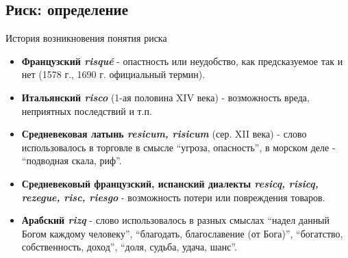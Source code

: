 \documentclass[financial_risks_lectures.tex]{subfiles}
\begin{document}
\subsection{Риск: определение}
\begin{frame}[shrink=15]{История возникновения понятия риска}
\begin{itemize}[<+->]
\item
\textbf{Французский \textit{\foreignlanguage{french}{risqué}}} - опастность или неудобство, как предсказуемое так и нет (1578 г., 1690 г. официальный термин).
\item
\textbf{Итальянский \textit{risco}} (1-ая половина XIV века) - возможность вреда, неприятных последствий и т.п.

\item
\textbf{Средневековая латынь \textit{resicum, risicum}} (сер. XII века) - слово использовалось в торговле в смысле ``угроза, опасность'', в морском деле - ``подводная скала, риф''.

\item
\textbf{Средневековый французский, испанский диалекты \textit{resicq, risicq, rezegue, risc, riesgo}} - возможность потери или повреждения товаров.

\item
\textbf{Арабский \textit{rizq }}- слово использовалось в разных смыслах ``надел данный Богом каждому человеку'', ``благодать, благославение (от Бога)'', ``богатство, собственность, доход'', ``доля, судьба, удача, шанс''.

\end{itemize}

\end{frame}
\end{document}
